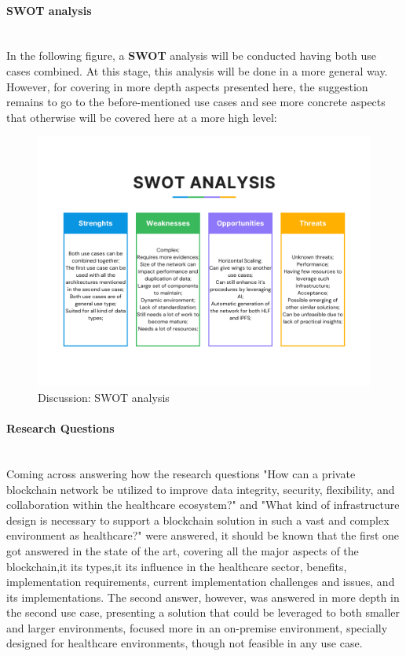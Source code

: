 \paragraph{SWOT analysis}\mbox{}\\
In the following figure, a \textbf{SWOT} analysis will be conducted having both use cases combined. At this stage, this analysis will be done in a more general way. However, for covering in more depth aspects presented here, the suggestion remains to go to the before-mentioned use cases and see more concrete aspects that otherwise will be covered here at a more high level:

\begin{figure}[H]
	\centering
	\includegraphics[width=0.9\linewidth]{assets/discussion/SWOT-analysis-general}
	\caption{Discussion: SWOT analysis}
	\label{fig:swot-analysis-general}
\end{figure}


\paragraph{Research Questions}\mbox{}\\
Coming across answering how the research questions "How can a private blockchain network be utilized to improve data integrity, security, flexibility, and collaboration within the healthcare ecosystem?" and "What kind of infrastructure design is necessary to support a blockchain solution in such a vast and complex environment as healthcare?" were answered, it should be known that the first one got answered in the state of the art, covering all the major aspects of the blockchain,it its types,it its influence in the healthcare sector, benefits, implementation requirements, current implementation challenges and issues, and its implementations. The second answer, however, was answered in more depth in the second use case, presenting a solution that could be leveraged to both smaller and larger environments, focused more in an on-premise environment, specially designed for healthcare environments, though not feasible in any use case.